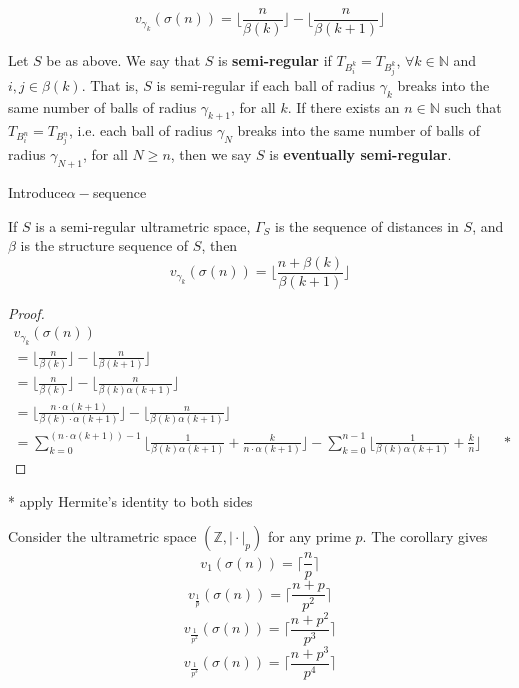 \begin{proposition*}
\begin{proposition*}
\[v_{\gamma_k}(\sigma(n)) = \lfloor\frac{n}{\beta(k)}\rfloor - \lfloor\frac{n}{\beta(k+1)}\rfloor \]
\end{proposition*}


\begin{definition*}
Let $S$ be as above. We say that $S$ is \textbf{semi-regular} if $T_{B^k_i} = T_{B^k_j}$, $\forall k \in \mathbb{N}$ and  $i,j \in \beta(k)$. That is, $S$ is semi-regular if each ball of radius $\gamma_k$ breaks into the same number of balls of radius $\gamma_{k+1}$, for all $k$. If there exists an $n \in \mathbb{N}$ such that $T_{B^n_i} = T_{B^n_j}$, i.e.  each ball of radius $\gamma_N$ breaks into the same number of balls of radius $\gamma_{N+1}$, for all $N \geq n$, then we say $S$ is \textbf{eventually semi-regular}.
\end{definition*}

Introduce$\alpha-$sequence 

\begin{corollary*}
If $S$ is a semi-regular ultrametric space, $\Gamma_S$ is the sequence of distances in $S$, and $\beta$ is the structure sequence of $S$, then \[v_{\gamma_k}(\sigma(n)) = \lfloor\frac{n +\beta(k)}{\beta(k+1)}\rfloor \]
\end{corollary*}

\begin{proof}

\begin{align*}
v_{\gamma_k}(\sigma(n)) && \\
= \lfloor\frac{n}{\beta(k)}\rfloor - \lfloor\frac{n}{\beta(k+1)}\rfloor && \\
= \lfloor\frac{n}{\beta(k)}\rfloor - \lfloor\frac{n}{\beta(k)\alpha(k+1)}\rfloor && \\
= \lfloor\frac{n \cdot \alpha(k+1)}{\beta(k)\cdot \alpha(k+1)}\rfloor - \lfloor\frac{n}{\beta(k)\alpha(k+1)}\rfloor && \\
= \sum_{k=0}^{(n \cdot \alpha(k+1))-1} \lfloor \frac{1}{\beta(k)\alpha(k+1)} + \frac{k}{n\cdot \alpha(k+1)} \rfloor - \sum_{k=0}^{n-1} \lfloor \frac{1}{\beta(k)\alpha(k+1)} + \frac{k}{n} \rfloor && *
\end{align*}

\end{proof}

* apply Hermite's identity to both sides
\begin{example}
Consider the ultrametric space $(\mathbb{Z}, \rvert \cdot \lvert_p)$  for any prime $p$. The corollary gives 
\[v_{1}(\sigma(n)) = \lceil\frac{n}{p}\rceil\]
\[v_{\frac{1}{p}}(\sigma(n)) = \lceil\frac{n +p }{p^2}\rceil\]
\[v_{\frac{1}{p^2}}(\sigma(n)) = \lceil\frac{n + p^2}{p^3}\rceil\]
\[v_{\frac{1}{p^3}}(\sigma(n)) = \lceil\frac{n + p^3}{p^4}\rceil\]


\end{example}
\end{proposition*}
